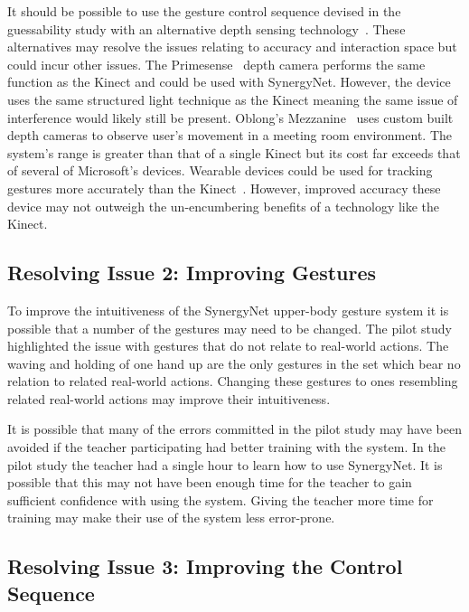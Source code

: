 \documentclass[link]{IWCOMP}
\begin{document}
It should be possible to use the gesture control sequence devised in the guessability study with an alternative depth sensing technology~\citep{Kean2011}.
These alternatives may resolve the issues relating to accuracy and interaction space but could incur other issues.
The Primesense~\citep{Wilson2010} depth camera performs the same function as the Kinect and could be used with SynergyNet.
However, the device uses the same structured light technique as the Kinect meaning the same issue of interference would likely still be present.
Oblong's Mezzanine~\citep{kramer2011} uses custom built depth cameras to observe user's movement in a meeting room environment.
The system's range is greater than that of a single Kinect but its cost far exceeds that of several of Microsoft's devices.
Wearable devices could be used for tracking gestures more accurately than the Kinect~\citep{Rekimotoa,Zhu2011}.
However, improved accuracy these device may not outweigh the un-encumbering benefits of a technology like the Kinect.

\subsection{Resolving Issue 2: Improving Gestures}
\label{subsec:resolvingIssuesObserved2}

To improve the intuitiveness of the SynergyNet upper-body gesture system it is possible that a number of the gestures may need to be changed.
The pilot study highlighted the issue with gestures that do not relate to real-world actions. 
The waving and holding of one hand up are the only gestures in the set which bear no relation to related real-world actions.
Changing these gestures to ones resembling related real-world actions may improve their intuitiveness.

It is possible that many of the errors committed in the pilot study may have been avoided if the teacher participating had better training with the system.
In the pilot study the teacher had a single hour to learn how to use SynergyNet.
It is possible that this may not have been enough time for the teacher to gain sufficient confidence with using the system.
Giving the teacher more time for training may make their use of the system less error-prone.

\subsection{Resolving Issue 3: Improving the Control Sequence}
\label{subsec:resolvingIssuesObserved3}
\end{document}
